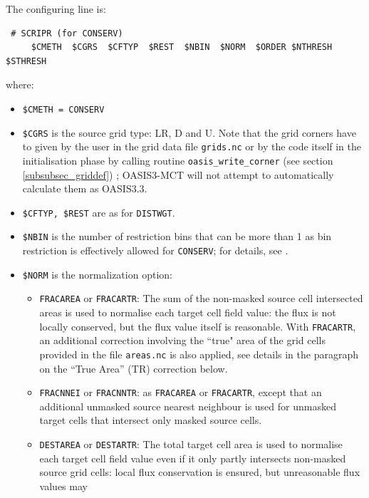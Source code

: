 \begin{itemize}
\begin{itemize}
    The configuring line is:
  \begin{verbatim}
 # SCRIPR (for CONSERV)
     $CMETH  $CGRS  $CFTYP  $REST  $NBIN  $NORM  $ORDER $NTHRESH $STHRESH
\end{verbatim}
    \vspace{-0.5cm} where:
    \begin{itemize}
    \item {\tt \$CMETH = CONSERV}
    \item {\tt \$CGRS} is the source grid type: LR, D and U. Note that
      the grid corners have to given by the user in the grid data file
      {\tt grids.nc} or by the code itself in the initialisation phase
      by calling routine {\tt oasis\_write\_corner} (see section
      \ref{subsubsec_griddef}) ; OASIS3-MCT will not attempt to
      automatically calculate them as OASIS3.3.
    \item {\tt \$CFTYP, \$REST} are as for {\tt DISTWGT}.
    \item {\tt \$NBIN} is the number of restriction bins that can be more than 1 as bin restriction is effectively allowed for {\tt CONSERV}; for details, see \citep{piacentini08}.
    \item {\tt \$NORM} is the normalization option:
      \begin{itemize}
       \item {\tt FRACAREA} or {\tt FRACARTR}: The sum of the non-masked source cell
        intersected areas is used to normalise each target cell field
        value: the flux is not locally conserved, but the flux value
        itself is reasonable. With {\tt FRACARTR}, an additional correction involving the ``true" area of the grid cells
        provided in the file {\tt areas.nc} is also applied, see details in the paragraph on the ``True Area'' (TR) correction below.
      \item {\tt FRACNNEI} or {\tt FRACNNTR}: as {\tt FRACAREA} or {\tt FRACARTR}, except that an additional unmasked source nearest neighbour is used for unmasked
        target cells that intersect only masked source cells.
       \item {\tt DESTAREA} or {\tt DESTARTR}: The total target cell area is used to
        normalise each target cell field value even if it only partly
        intersects non-masked source grid cells: local flux
        conservation is ensured, but unreasonable flux values may

\end{itemize}
\end{itemize}
\end{itemize}
\end{itemize}
